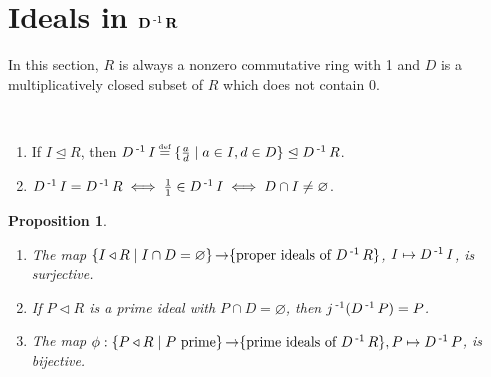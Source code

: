\documentclass[11pt]{book}
\newcounter{counter}
\newtheorem{proposition}[counter]{Proposition}   \newtheorem{problem}[counter]{Problem}   \newtheorem*{proposition*}{Proposition}   \newtheorem*{lemma*}{Lemma}
\theoremstyle{definition}   \newtheorem{defn}[counter]{Definition} %
\newcommand{\nsg}{\mathrel{\unlhd}}   \newcommand{\ind}{\parindent24pt}   \newcommand{\vn}{\varnothing}
\newcommand\myeq{\mathrel{\overset{\makebox[0pt]{\mbox{\normalfont\tiny\sffamily \textrm{def}}}}{=}}}
\newcommand{\tl}{\triangleleft}   \newcommand{\sd}[1]{\rtimes_{#1}}   \newcommand{\x}{^{\times}}   \newcommand{\cyc}[1]{\begin{pmatrix} #1 \end{pmatrix}}
\DeclareMathOperator{\ra}{\rightarrow}   \DeclareMathOperator{\Poly}{\mathbf{P}}   \DeclareMathOperator{\spn}{\textnormal{span}}   \DeclareMathOperator{\aut}{\textnormal{Aut}}
\newcommand{\vs}{\vspace{8pt}}
\numberwithin{counter}{chapter}
\begin{document}
\vs

\section*{Ideals in $\mathbf{D\operatorname{^{-1}} R}$}

In this section, $R$ is always a nonzero commutative ring with 1 and $D$ is a multiplicatively closed subset of $R$ which does not contain 0.

\vs

\begin{remark}
\
\begin{enumerate}
\item[(a)] If $I \nsg R$, then $D\inv I \myeq \{\frac{a}{d} \mid a \in I, d \in D\} \nsg D\inv R$.
\item[(b)] $D\inv I = D\inv R \iff \frac{1}{1} \in D\inv I \iff D \cap I \ne \vn$.
\end{enumerate}
\end{remark}

\vs

\begin{proposition}
\
\begin{enumerate}
\item[(a)] The map $\{I \tl R \mid I \cap D = \vn \} \ra \{\tn{proper ideals of } D\inv R\}$, $I \mapsto D\operatorname{^{-1}} I$, is surjective.
\item[(b)] If $P \tl R$ is a prime ideal with $P \cap D = \vn$, then $j\operatorname{^{-1}}(D\operatorname{^{-1}} P) = P$.
\item[(c)] The map $\phi : \{P \tl R \mid P \tn{ prime}\} \ra \{\tn{prime ideals of } D\inv R\}, P \mapsto D\inv P$, is bijective.
\end{enumerate}
\end{proposition}
\end{document}
